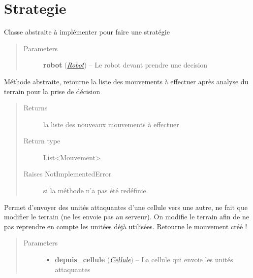 \documentclass[letterpaper,10pt,english]{sphinxmanual}
\begin{document}
\chapter{Strategie}
\label{index:module-Strategie}\label{index:strategie}

\begin{fulllineitems}
\label{index:Strategie.Strategie}
Classe abstraite à implémenter pour faire une stratégie
\begin{quote}\begin{description}
\item[{Parameters}] \leavevmode
\textbf{robot} ({\hyperref[index:module-Robot]{\emph{Robot}}}) -- Le robot devant prendre une decision

\end{description}\end{quote}

\begin{fulllineitems}
\label{index:Strategie.Strategie.decider}
Méthode abstraite, retourne la liste des mouvements à effectuer après analyse du terrain pour la prise de décision
\begin{quote}\begin{description}
\item[{Returns}] \leavevmode
la liste des nouveaux mouvements à effectuer

\item[{Return type}] \leavevmode
List\textless{}Mouvement\textgreater{}

\item[{Raises NotImplementedError}] \leavevmode
si la méthode n'a pas été redéfinie.

\end{description}\end{quote}

\end{fulllineitems}


\begin{fulllineitems}
\label{index:Strategie.Strategie.envoyerUnites}
Permet d'envoyer des unités attaquantes d'une cellule vers une autre, ne fait que modifier le terrain (ne les envoie pas au serveur).
On modifie le terrain afin de ne pas reprendre en compte les unitées déjà utilisées.
Retourne le mouvement créé !
\begin{quote}\begin{description}
\item[{Parameters}] \leavevmode\begin{itemize}
\item {} 
\textbf{depuis\_cellule} ({\hyperref[index:module-Cellule]{\emph{Cellule}}}) -- La cellule qui envoie les unités attaquantes


\end{itemize}
\end{description}
\end{quote}
\end{fulllineitems}
\end{fulllineitems}
\end{document}
